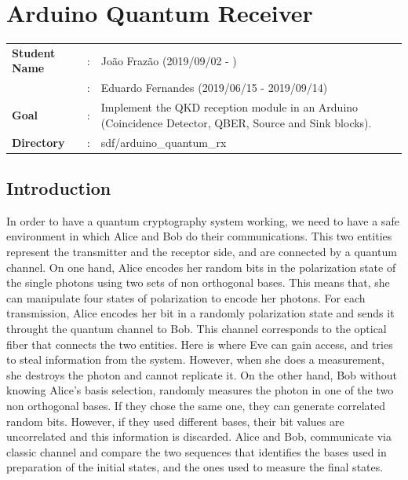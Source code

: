 \clearpage
\section{Arduino Quantum Receiver}

\begin{refsection}
	
	\begin{tcolorbox}	
		\begin{tabular}{p{2.75cm} p{0.2cm} p{10.5cm}} 	
			\textbf{Student Name}  		&:&  Jo\~ao Fraz\~ao (2019/09/02 - )\\
			&:&  Eduardo Fernandes (2019/06/15 - 2019/09/14)\\
			\textbf{Goal}          &:& Implement the QKD reception module in an Arduino (Coincidence Detector, QBER, Source and Sink blocks).\\
			\textbf{Directory}              &:& sdf/arduino\_quantum\_rx
		\end{tabular}
	\end{tcolorbox}
 
    \subsection{Introduction }
    In order to have a quantum cryptography system working, we need to have a safe environment in which Alice and Bob do their communications. This two entities represent the transmitter and the receptor side, and are connected by a quantum channel. On one hand, Alice encodes her random bits in the polarization state of the single photons using two sets of non orthogonal bases. This means that, she can manipulate four states of polarization to encode her  photons. For each transmission, Alice encodes her bit in a randomly polarization state and sends it throught the quantum channel to Bob. This channel corresponds to the optical fiber that connects the two entities. Here is where Eve can gain access, and tries to steal information from the system. However, when she does a measurement, she destroys the photon and cannot replicate it. On the other hand, Bob without knowing Alice's basis selection, randomly measures the photon in one of the two non orthogonal bases. If they chose the same one, they can generate correlated random bits. However, if they used different bases, their bit values are uncorrelated and this information is discarded. Alice and Bob, communicate via classic channel and compare the two sequences that identifies the bases used in preparation of the initial states, and the ones used to measure the final states.


\end{refsection}
